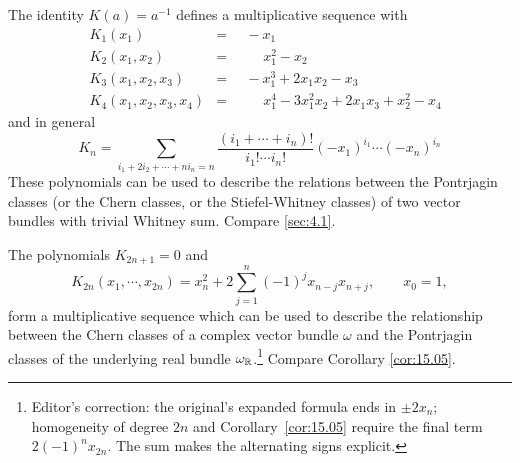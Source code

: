 \documentclass[../main]{subfiles}
\begin{document}
\begin{example}
The identity $K(a) = a^{-1}$ defines a multiplicative sequence with 
\[\begin{aligned}
    &K_1(x_1) &=& \,\,\,-x_1 \\
    &K_2(x_1,x_2) &=& \,\,\,\phantom{+\,\,\,}x_1^2 - x_2 \\
    &K_3(x_1,x_2,x_3) &=&\,\,\, -x_1^3 +2x_1x_2 -x_3 \\
    &K_4(x_1,x_2,x_3,x_4) &=& \,\,\,\phantom{+\,\,\,}x_1^4 -3x_1^2x_2 + 2x_1x_3 +x_2^2 -x_4 
\end{aligned}\]
and in general \[K_n = \sum_{i_1 + 2i_2 + \cdots + ni_n =n} \frac{(i_1 + \cdots + i_n)!}{i_1! \cdots i_n!}(-x_1)^{i_1}\cdots(-x_n)^{i_n} \]
These polynomials can be used to describe the relations between the Pontrjagin classes (or the Chern classes, or the Stiefel-Whitney classes) of two vector bundles with trivial Whitney sum. Compare \ref{sec:4.1}.
\end{example}

\begin{example}
The polynomials $K_{2n+1} =0$ and \[K_{2n}(x_1,\cdots,x_{2n}) = x_n^2 + 2\sum_{j=1}^{n}(-1)^j x_{n-j}x_{n+j}, \qquad x_0=1,\] form a multiplicative sequence which can be used to describe the relationship between the Chern classes of a complex vector bundle $\omega$ and the Pontrjagin classes of the underlying real bundle $\omega_\mathbb R$.\footnote{Editor's correction: the original's expanded formula ends in $\pm2x_n$; homogeneity of degree $2n$ and Corollary~\ref{cor:15.05} require the final term $2(-1)^n x_{2n}$. The sum makes the alternating signs explicit.} Compare Corollary \ref{cor:15.05}.
\end{example}
\end{document}
